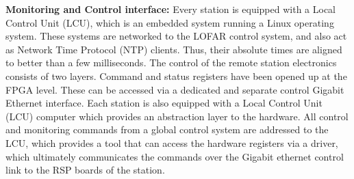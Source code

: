 \documentclass{ws-jai}
\begin{document}

\noindent \textbf {Monitoring and Control  interface:} Every station is equipped
with a  Local Control Unit  (LCU), which is an  embedded system running  a Linux
operating system.  These systems are networked  to the LOFAR control system, and
also act as Network Time Protocol  (NTP) clients. Thus, their absolute times are
aligned to  better than a  few milliseconds. The  control of the  remote station
electronics  consists of  two layers.   Command and  status registers  have been
opened up at the FPGA level.  These can be accessed via a dedicated and separate
control Gigabit Ethernet  interface. Each station is also equipped  with a Local
Control  Unit  (LCU)  computer  which  provides  an  abstraction  layer  to  the
hardware. All control  and monitoring commands from a global  control system are
addressed  to the  LCU,  which provides  a  tool that  can  access the  hardware
registers  via a  driver, which  ultimately communicates  the commands  over the
Gigabit ethernet control link to the RSP boards of the station.


\end{document}
